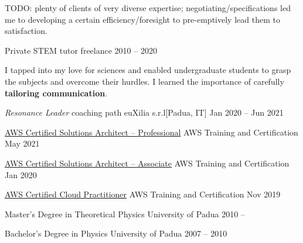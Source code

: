 \documentclass[9pt]{scrartcl}
\def\Phi{1.618}
\newlength{\Pad}\setlength{\Pad}{14.562pt} %
\begin{document}
TODO: plenty of clients of very diverse expertise; negotiating/specifications led me to developing a certain efficiency/foresight to pre-emptively lead them to satisfaction.


\Event
  {Private STEM tutor}
  {freelance}
  {2010 -- 2020}

I tapped into my love for sciences
and enabled undergraduate students
to grasp the subjects and overcome their hurdles.
I learned the importance of carefully \textbf{tailoring communication}.



\SimpleEvent
  {\emph{Resonance Leader} coaching path}
  {euXilia s.r.l}[Padua, IT]
  {Jan 2020 -- Jun 2021}

\SimpleEvent
  {\href{https://www.credly.com/badges/37aaaf27-3a2e-436d-9195-db4f46eb222e/public_url}
  {%
   AWS Certified Solutions Architect -- Professional}}
  {AWS Training and Certification}
  {May 2021}

\SimpleEvent
  {\href{https://www.credly.com/badges/d092afab-f194-4074-ade6-78728c854faa/public_url}
  {%
   AWS Certified Solutions Architect -- Associate}}
  {AWS Training and Certification}
  {Jan 2020}

\SimpleEvent
  {\href{https://www.credly.com/badges/d268e963-65ba-462b-a835-f65a7baccccd/public_url}
  {%
   AWS Certified Cloud Practitioner}}
  {AWS Training and Certification}
  {Nov 2019}

\SimpleEvent
  {Master's Degree in Theoretical Physics}
  {University of Padua}
  {2010 -- }


\SimpleEvent
  {Bachelor's Degree in Physics}
  {University of Padua}
  {2007 -- 2010}

\end{document}
